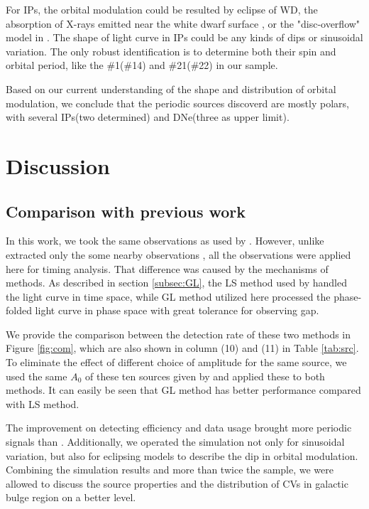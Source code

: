 \documentclass[twoside,twocolumn]{aastex63}
\begin{document}
For IPs, the orbital modulation could be resulted by eclipse of WD, the absorption of X-rays emitted near the white
dwarf surface \citep{1993MNRAS.260..299H}, or the "disc-overflow" model in \citep{1996MNRAS.280..937N}. The shape of light curve in IPs could be any kinds of dips or sinusoidal variation. The only robust identification is to determine both their spin and orbital period, like the \#1(\#14) and \#21(\#22) in our sample.

Based on our current understanding of the shape and distribution of orbital modulation, we conclude that the periodic sources discoverd are mostly polars, with several IPs(two determined) and DNe(three as upper limit). 

\section{Discussion}\label{sec:discussion}
\subsection{Comparison with previous work} \label{subsec:compare}
In this work, we took the same observations as used by \cite{2012ApJ...746..165H}. However, unlike \cite{2012ApJ...746..165H} extracted only the some nearby observations , all the observations were applied here for timing analysis. That difference was caused by the mechanisms of methods. As described in section \ref{subsec:GL}, the LS method used by \cite{2012ApJ...746..165H} handled the light curve in time space, while GL method utilized here  processed the phase-folded light curve in phase space with great tolerance for observing gap.

 We provide the comparison between the detection rate of these two methods in Figure \ref{fig:com}, which are also shown in column (10) and (11) in Table \ref{tab:src}. To eliminate the effect of different choice of amplitude for the same source, we used the same $A_0$ of these ten sources given by \cite{2012ApJ...746..165H} and applied these to both methods. It can easily be seen that GL method has better performance compared with LS method.

The improvement on detecting efficiency and data usage brought more periodic signals than \cite{2012ApJ...746..165H}. Additionally, we operated the simulation not only for sinusoidal variation, but also for eclipsing models to describe the dip in orbital modulation. Combining the simulation results and more than twice the sample, we were allowed to discuss the source properties and the distribution of CVs in galactic bulge region on a better level.
\end{document}
